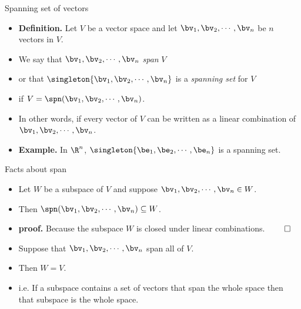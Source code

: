 \documentclass[handout]{beamer}
\begin{document}
\begin{frame}{Spanning set of vectors}

\begin{itemize}
\item \textbf{Definition.} Let $V$ be a vector space and let $\bv_1,\bv_2,\cdots,\bv_n$ be $n$ vectors in $V$.
\item We say that $\bv_1,\bv_2,\cdots,\bv_n$ \emph{span} $V$
\item or that $\singleton{\bv_1,\bv_2,\cdots,\bv_n}$ is a \emph{spanning set} for $V$
\item if $V=\spn(\bv_1,\bv_2,\cdots,\bv_n)$.
\item In other words, if every vector of $V$ can be written as a linear combination of
 $\bv_1,\bv_2,\cdots,\bv_n$.
 \item \textbf{Example.} In $\R^n$, $\singleton{\be_1,\be_2,\cdots,\be_n}$ is a
 spanning set.
\end{itemize}

\end{frame}

\begin{frame}{Facts about span}

\begin{itemize}
\item Let $W$ be a subspace of $V$ and suppose $\bv_1,\bv_2,\cdots,\bv_n\in W$.\
\item Then $\spn(\bv_1,\bv_2,\cdots,\bv_n)\subseteq W$.
\item \textbf{proof.} Because the subspace $W$ is closed under linear combinations. $\qed$
\item Suppose that $\bv_1,\bv_2,\cdots,\bv_n$ span all of $V$.
\item Then $W=V$.
\item i.e. If a subspace contains a set of vectors that span the whole space then
that subspace is the whole space.
\end{itemize}

\end{frame}
\end{document}
